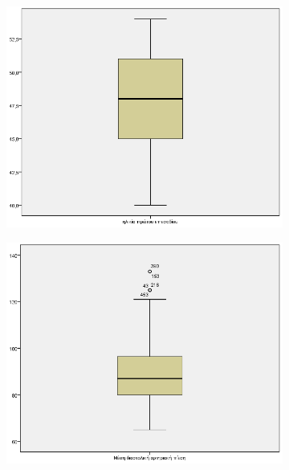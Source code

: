     \clearpage
    \begin{figure}
 \centering
            \begin{subfigure}{0.7\textwidth}
     \centering
         \includegraphics[width=\textwidth]{images/17.png}
                      \end{subfigure}
                      
     \begin{subfigure}{0.7\textwidth}
     \centering
      \vspace{1cm}
         \includegraphics[width=\textwidth]{images/18.png}
                      \end{subfigure}
    \end{figure}
    
